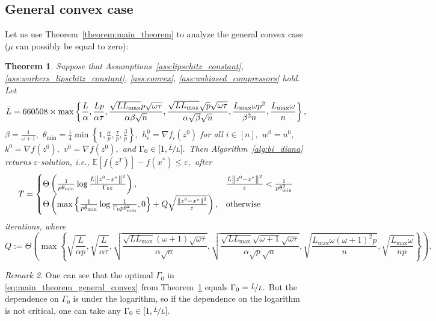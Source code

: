 \documentclass{article} %
\newcommand{\norm}[1]{\left\| #1 \right\|}
\newcommand{\Exp}[1]{{\mathbb{E}}\left[#1\right]}
\theoremstyle{plain}
\newtheorem{theorem}{Theorem}[section]
\theoremstyle{definition}
\theoremstyle{remark}
\newtheorem{remark}[theorem]{Remark}
\newcommand{\eqdef}{:=}
\begin{document}
\subsection{General convex case}
Let us use Theorem~\ref{theorem:main_theorem} to analyze the general convex case ($\mu$ can possibly be equal to zero):
\begin{theorem}
  \label{theorem:main_theorem_general_convex}
  Suppose that Assumptions~\ref{ass:lipschitz_constant}, \ref{ass:workers_lipschitz_constant}, \ref{ass:convex}, \ref{ass:unbiased_compressors} hold. Let
\begin{align}
  \bar{L} = 660508 \times \max\left\{\frac{L}{\alpha}, \frac{L p}{\alpha \tau}, \frac{\sqrt{L L_{\max}} p \sqrt{\omega \tau}}{\alpha \beta \sqrt{n}}, \frac{\sqrt{L L_{\max}} \sqrt{p} \sqrt{\omega \tau}}{\alpha \sqrt{\beta} \sqrt{n}}, \frac{L_{\max} \omega p^2}{\beta^2 n}, \frac{L_{\max} \omega}{n}\right\},
\end{align}
$\beta = \frac{1}{\omega + 1},$ $\theta_{\min} = \frac{1}{4}\min\left\{1, \frac{\alpha}{p}, \frac{\tau}{p}, \frac{\beta}{p}\right\},$ $h_i^0 = \nabla f_i(z^{0})$ for all $i \in [n],$ $w^0 = u^0,$ $k^{0} = \nabla f(z^0),$ $v^{0} = \nabla f(z^0),$ and $\Gamma_0 \in [1, \nicefrac{\bar{L}}{L}].$
Then Algorithm~\ref{alg:bi_diana} returns $\varepsilon$-solution, i.e., $\Exp{f(z^{T})}- f(x^*) \leq \varepsilon,$ after
\begin{equation}
\begin{aligned}
  \label{eq:main_theorem_general_convex}
    T = 
    \begin{cases}
      \Theta\left(\frac{1}{p \theta_{\min}} \log \frac{\bar{L} \norm{z^0 - x^*}^2}{\Gamma_0 \varepsilon}\right), &\frac{\bar{L} \norm{z^0 - x^*}^2}{\varepsilon} < \frac{1}{p \theta_{\min}^2} \\
      \Theta\left(\max\left\{\frac{1}{p \theta_{\min}} \log \frac{1}{\Gamma_0 p \theta_{\min}^2}, 0\right\} + Q\sqrt{\frac{\norm{z^0 - x^*}^2}{\varepsilon}}\right), & \textnormal{otherwise}
    \end{cases}
\end{aligned}
\end{equation}
iterations,
where
$$Q \eqdef \Theta\left(\max\left\{\sqrt{\frac{L}{\alpha p}}, \sqrt{\frac{L}{\alpha \tau}}, \sqrt{\frac{\sqrt{L L_{\max}} (\omega + 1)\sqrt{\omega \tau}}{\alpha \sqrt{n}}}, \sqrt{\frac{\sqrt{L L_{\max}} \sqrt{\omega + 1} \sqrt{\omega \tau}}{\alpha \sqrt{p} \sqrt{n}}}, \sqrt{\frac{L_{\max} \omega (\omega + 1)^2 p}{n}}, \sqrt{\frac{L_{\max} \omega}{n p}}\right\}\right).$$
\end{theorem}

\begin{remark}
  One can see that the optimal $\Gamma_0$ in \eqref{eq:main_theorem_general_convex} from Theorem~\ref{theorem:main_theorem_general_convex} equals $\Gamma_0 = \nicefrac{\bar{L}}{L}.$ But the dependence on $\Gamma_0$ is under the logarithm, so if the dependence on the logarithm is not critical, one can take any $\Gamma_0 \in [1, \nicefrac{\bar{L}}{L}].$
\end{remark}
\end{document}
